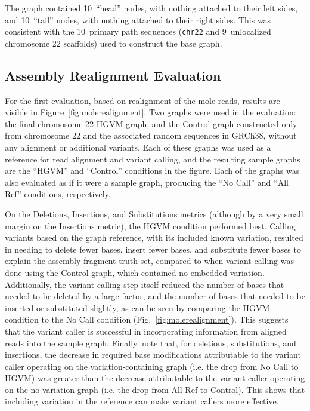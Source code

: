 The graph contained 10~``head'' nodes, with nothing attached to their left sides, and 10~``tail'' nodes, with nothing attached to their right sides. This was consistent with the 10~primary path sequences (\texttt{chr22} and 9~unlocalized chromosome 22 scaffolds) used to construct the base graph.

\subsection{Assembly Realignment Evaluation}
\label{subsec:assemblyrealignmenteval}

For the first evaluation, based on realignment of the mole reads, results are visible in Figure~\ref{fig:molerealignment}. Two graphs were used in the evaluation: the final chromosome 22 HGVM graph, and the Control graph constructed only from chromosome 22 and the associated random sequences in GRCh38, without any alignment or additional variants. Each of these graphs was used as a reference for read alignment and variant calling, and the resulting sample graphs are the ``HGVM'' and ``Control'' conditions in the figure. Each of the graphs was also evaluated as if it were a sample graph, producing the ``No Call'' and ``All Ref'' conditions, respectively.

On the Deletions, Insertions, and Substitutions metrics (although by a very small margin on the Insertions metric), the HGVM condition performed best. Calling variants based on the graph reference, with its included known variation, resulted in needing to delete fewer bases, insert fewer bases, and substitute fewer bases to explain the assembly fragment truth set, compared to when variant calling was done using the Control graph, which contained no embedded variation. Additionally, the variant calling step itself reduced the number of bases that needed to be deleted by a large factor, and the number of bases that needed to be inserted or substituted slightly, as can be seen by comparing the HGVM condition to the No Call condition (Fig.~\ref{fig:molerealignment}). This suggests that the variant caller is successful in incorporating information from aligned reads into the sample graph. Finally, note that, for deletions, substitutions, and insertions, the decrease in required base modifications attributable to the variant caller operating on the variation-containing graph (i.e. the drop from No Call to HGVM) was greater than the decrease attributable to the variant caller operating on the no-variation graph (i.e. the drop from All Ref to Control). This shows that including variation in the reference can make variant callers more effective.

